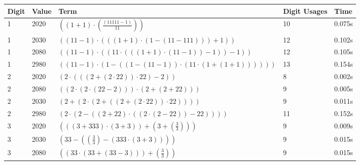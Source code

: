 \documentclass{article}
\theoremstyle{nonumberplain}
\begin{document}
%
\begin{center}
    \begin{longtable}{ | l | l | p{9.5cm} | l | l | }
    \hline \textbf{Digit} & \textbf{Value} & \textbf{Term} & \textbf{Digit Usages} & \textbf{Time} \\\hline
            1 & 2020 & \( \left(\left(1 + 1\right) \cdot \left(\frac{\left(11111 - 1\right)}{11}\right)\right) \) & 10 & 0.075s \\\hline
            1 & 2030 & \( \left(\left(11 - 1\right) \cdot \left(\left(\left(1 + 1\right) \cdot \left(1 - \left(11 - 111\right)\right)\right) + 1\right)\right) \) & 12 & 0.102s \\\hline
            1 & 2080 & \( \left(\left(11 - 1\right) \cdot \left(\left(11 \cdot \left(\left(\left(1 + 1\right) \cdot \left(11 - 1\right)\right) - 1\right)\right) - 1\right)\right) \) & 12 & 0.105s \\\hline
            1 & 2980 & \( \left(\left(11 - 1\right) \cdot \left(1 - \left(\left(1 - \left(11 - 1\right)\right) \cdot \left(11 \cdot \left(1 + \left(1 + 1\right)\right)\right)\right)\right)\right) \) & 13 & 0.154s \\\hline
            2 & 2020 & \( \left(2 \cdot \left(\left(\left(2 + \left(2 \cdot 22\right)\right) \cdot 22\right) - 2\right)\right) \) & 8 & 0.002s \\\hline
            2 & 2080 & \( \left(\left(2 \cdot \left(2 \cdot \left(22 - 2\right)\right)\right) \cdot \left(2 + \left(2 + 22\right)\right)\right) \) & 9 & 0.005s \\\hline
            2 & 2030 & \( \left(2 + \left(2 \cdot \left(2 + \left(\left(2 + \left(2 \cdot 22\right)\right) \cdot 22\right)\right)\right)\right) \) & 9 & 0.011s \\\hline
            2 & 2980 & \( \left(2 \cdot \left(2 - \left(\left(2 + 22\right) \cdot \left(\left(2 \cdot \left(2 - 22\right)\right) - 22\right)\right)\right)\right) \) & 11 & 0.152s \\\hline
            3 & 2020 & \( \left(\left(\left(3 + 333\right) \cdot \left(3 + 3\right)\right) + \left(3 + \left(\frac{3}{3}\right)\right)\right) \) & 9 & 0.009s \\\hline
            3 & 2030 & \( \left(33 - \left(\left(\frac{3}{3}\right) - \left(333 \cdot \left(3 + 3\right)\right)\right)\right) \) & 9 & 0.015s \\\hline
            3 & 2080 & \( \left(\left(33 \cdot \left(33 + \left(33 - 3\right)\right)\right) + \left(\frac{3}{3}\right)\right) \) & 9 & 0.015s \\\hline

\end{longtable}
\end{center}
\end{document}
